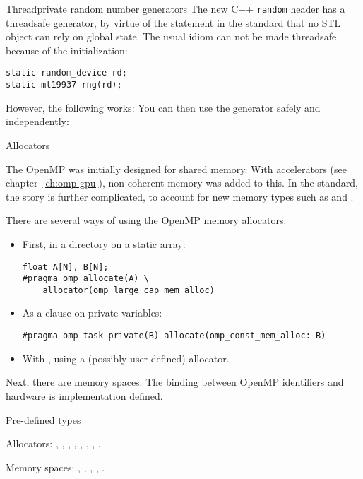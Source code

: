 \begin{cppnote}{Threadprivate random number generators}
  The new C++ \lstinline{random} header has a threadsafe generator,
  by virtue of the statement in the standard that no STL object
  can rely on global state.
  The usual idiom 
can not be made threadsafe because of the initialization:
\begin{lstlisting}
static random_device rd;
static mt19937 rng(rd);    
\end{lstlisting}

However, the following works:
%
%
You can then use the generator safely and independently:
%
\end{cppnote}

 {Allocators}

The OpenMP was initially designed for shared memory.
With accelerators (see chapter~\ref{ch:omp-gpu}), non-coherent memory was added to this.
In the  standard, the story is further complicated, to account
for new memory types such as 
and .

There are several ways of using the OpenMP memory allocators.
\begin{itemize}
\item
  First, in a directory on a static array:
\begin{lstlisting}
float A[N], B[N];
#pragma omp allocate(A) \
    allocator(omp_large_cap_mem_alloc)
\end{lstlisting}
\item As a clause on private variables:
\begin{lstlisting}
#pragma omp task private(B) allocate(omp_const_mem_alloc: B)
\end{lstlisting}
\item
  With , using a (possibly user-defined) allocator.
\end{itemize}

Next, there are memory spaces. The binding between OpenMP identifiers and hardware
is implementation defined.

 {Pre-defined types}

Allocators:
,
,
,
,
,
,
,
.

Memory spaces:
,
,
,
,
.

